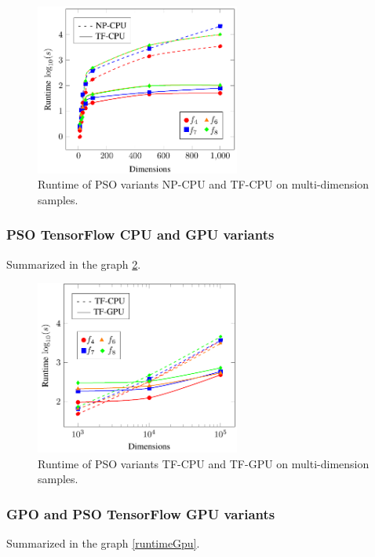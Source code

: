 \documentclass[10pt]{article}
\begin{document}
\begin{figure}[h!]
 \centering
 \includegraphics[width=0.6\textwidth]{runtimeCpu.png}
 \caption{Runtime of PSO variants NP-CPU and TF-CPU on multi-dimension samples.
          \label{runtimeCpu}}
\end{figure}

\subsubsection{PSO TensorFlow CPU and GPU variants}

Summarized in the graph \hyperref[runtimeCpuGpu]{\ref{runtimeCpuGpu}}.

\begin{figure}[h!]
 \centering
 \includegraphics[width=0.6\textwidth]{runtimeCpuGpu.png}
 \caption{Runtime of PSO variants TF-CPU and TF-GPU on multi-dimension samples.
          \label{runtimeCpuGpu}}
\end{figure}

\subsubsection{GPO and PSO TensorFlow GPU variants}

Summarized in the graph \hyperref[runtimeGpu]{\ref{runtimeGpu}}.
\end{document}
